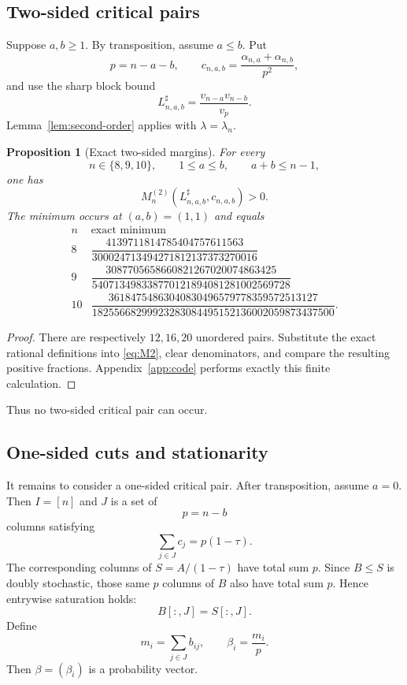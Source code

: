 \documentclass[11pt]{article}
\newtheorem{proposition}[theorem]{Proposition}
\theoremstyle{definition}
\newcommand{\1}{\mathbf{1}}
\begin{document}
\subsection{Two-sided critical pairs}

Suppose $a,b\ge1$.  By transposition, assume $a\le b$.  Put
\[
 p=n-a-b,
 \qquad
 c_{n,a,b}=
 \frac{\alpha_{n,a}+\alpha_{n,b}}{p^2},
\]
and use the sharp block bound
\[
 L^{\sharp}_{n,a,b}=\frac{v_{n-a}v_{n-b}}{v_p}.
\]
Lemma~\ref{lem:second-order} applies with $\lambda=\lambda_n$.

\begin{proposition}[Exact two-sided margins]\label{prop:low-two-sided}
For every
\[
 n\in\{8,9,10\},
 \qquad
 1\le a\le b,
 \qquad
 a+b\le n-1,
\]
one has
\[
 M_n^{(2)}(L^{\sharp}_{n,a,b},c_{n,a,b})>0.
\]
The minimum occurs at $(a,b)=(1,1)$ and equals
\[
\begin{array}{c|c}
 n&\text{exact minimum}\\ \hline
 8&
 \dfrac{4139711814785404757611563}
 {300024713494271812137373270016}\\[4mm]
 9&
 \dfrac{3087705658660821267020074863425}
 {540713498338770121894081281002569728}\\[4mm]
 10&
 \dfrac{36184754863040830496579778359572513127}
 {18255668299923283084495152136002059873437500}.
\end{array}
\tag{7.5}\label{eq:low-two-sided-table}
\]
\end{proposition}

\begin{proof}
There are respectively $12,16,20$ unordered pairs.  Substitute the exact rational definitions into \eqref{eq:M2}, clear denominators, and compare the resulting positive fractions.  Appendix~\ref{app:code} performs exactly this finite calculation.
\end{proof}

Thus no two-sided critical pair can occur.

\subsection{One-sided cuts and stationarity}

It remains to consider a one-sided critical pair.  After transposition, assume $a=0$.  Then $I=[n]$ and $J$ is a set of
\[
 p=n-b
\]
columns satisfying
\[
 \sum_{j\in J}c_j=p(1-\tau).
 \tag{7.6}\label{eq:one-sided-mass}
\]
The corresponding columns of $S=A/(1-\tau)$ have total sum $p$.  Since $B\le S$ is doubly stochastic, those same $p$ columns of $B$ also have total sum $p$.  Hence entrywise saturation holds:
\[
 B[:,J]=S[:,J].
 \tag{7.7}\label{eq:saturation}
\]
Define
\[
 m_i=\sum_{j\in J}b_{ij},
 \qquad
 \beta_i=\frac{m_i}{p}.
 \tag{7.8}\label{eq:beta}
\]
Then $\beta=(\beta_i)$ is a probability vector.
\end{document}
